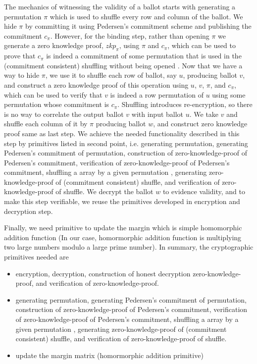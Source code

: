 \documentclass{llncs}
\begin{document}
The mechanics of witnessing the validity of a ballot starts with generating a 
permutation $\pi$ which is used to shuffle every row and column of the ballot.
We hide $\pi$ by committing it using Pedersen's 
commitment scheme 
and publishing  the commitment $c_{\pi}$. However, for the binding step, rather 
than opening $\pi$ we generate a zero knowledge proof, $zkp_{\pi}$, 
using $\pi$ and $c_{\pi}$, which can 
be  used to prove that $c_{\pi}$ is indeed a commitment of some permutation
that is used in the (commitment consistent) shuffling 
 without being opened \cite{Wikstrom:2009:CPS}. Now that we have a way 
 to hide $\pi$, we use it to shuffle each row of 
ballot, say $u$, producing ballot $v$, and construct a zero knowledge proof 
of this operation using $u$, $v$, $\pi$, and $c_{\pi}$, which can be used 
to verify that $v$ is indeed a row permutation of $u$ using some permutation 
whose commitment is $c_{\pi}$. Shuffling 
introduces re-encryption, so there is no way to correlate the output
ballot $v$ with input ballot $u$.  We take $v$ and shuffle each column of it 
by $\pi$ producing ballot $w$, and construct zero knowledge proof same 
as last step. We achieve the needed functionality described in this step
by primitives listed in second point, i.e. 
generating permutation, generating  Pedersen's 
commitment \cite{Pederson} of permutation, construction of 
zero-knowledge-proof of Pedersen's commitment, verification of 
zero-knowledge-proof of Pedersen's commitment, shuffling a array 
by a given permutation \cite{Wikstrom:2009:CPS}, 
generating zero-knowledge-proof of (commitment consistent) shuffle, 
and verification of zero-knowledge-proof of shuffle.
We decrypt the ballot $w$ to evidence validity, and to make this step
 verifiable, we reuse the primitives developed in
 encryption and decryption step.


Finally, we need primitive to update the margin which is simple homomorphic
addition function (In our case, homormorphic 
 addition function is multiplying two large numbers modulo a large prime 
 number).
In summary, the cryptographic primitives needed are 
\begin{itemize} 
\item encryption, decryption, construction of honest decryption
     zero-knowledge-proof, and verification of zero-knowledge-proof. 
\item generating permutation, generating  Pedersen's 
     commitment \cite{Pederson} of permutation, construction of 
     zero-knowledge-proof of Pedersen's commitment, verification of 
     zero-knowledge-proof of Pedersen's commitment, shuffling a array 
     by a given permutation \cite{Wikstrom:2009:CPS}, 
     generating zero-knowledge-proof of (commitment consistent) shuffle, 
     and verification of zero-knowledge-proof of shuffle.
\item  update the margin matrix (homormorphic addition primitive)
\end{itemize}
\end{document}
